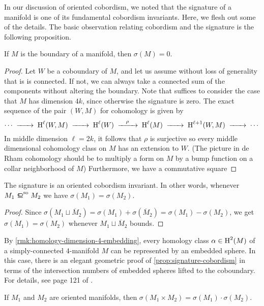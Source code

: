 \begin{remark}
In our discussion of oriented cobordism, we noted that the signature of a manifold is one of its fundamental cobordism invariants. Here, we flesh out some of the details. The basic observation relating cobordism and the signature is the following proposition.

\begin{proposition}\label{prop:signature-cobordism}
	If $M$ is the boundary of a manifold, then $\sigma(M)=0$.
\end{proposition}
\begin{proof}
	Let $W$ be a coboundary of $M$, and let us assume without loss of generality that is is connected. If not, we can always take a connected sum of the components without altering the boundary. Note that suffices to consider the case that $M$ has dimension $4k$, since otherwise the signature is zero. The exact sequence of the pair $(W,M)$ for cohomology is given by
	\[
		\cdots \lkxto \H^\ell(W,M)\lkxto \H^\ell(W)\lkxto[\rho] \H^{\ell}(M)\lkxto \H^{\ell+1}(W,M)\lkxto\cdots
	\]
	In middle dimension $\ell=2k$, it follows that $\rho$ is surjective so every middle dimensional cohomology class on $M$ has an extension to $W$. (The picture in de Rham cohomology should be to multiply a form on $M$ by a bump function on a collar neighborhood of $M$) Furthermore, we have a commutative square
\end{proof}

\begin{corollary}
	The signature is an oriented cobordism invariant. In other words, whenever $M_1\sobord M_2$ we have $\sigma(M_1)=\sigma(M_2)$.
\end{corollary}
\begin{proof}
Since $\sigma(M_1\sqcup\overline{M}_2)=\sigma(M_1)+\sigma(\overline{M}_2)=\sigma(M_1)-\sigma(M_2)$, we get $\sigma(M_1)=\sigma(M_2)$ whenever $M_1\sqcup \overline{M}_2$ bounds.
\end{proof}

\begin{remark}
	By \cref{rmk:homology-dimension-4-embedding}, every homology class $\alpha\in \operatorname{H}^2(M)$ of a simply-connected $4$-manifold $M$ can be represented by an embedded sphere. In this case, there is an elegant geometric proof of \cref{prop:signature-cobordism} in terms of the intersection numbers of embedded spheres lifted to the coboundary. For details, see page 121 of \cite{scorpan2005wild}.
\end{remark}

\begin{proposition}
	If $M_1$ and $M_2$ are oriented manifolds, then $\sigma(M_1\times M_2)=\sigma(M_1)\cdot \sigma(M_2)$.
\end{proposition}


\end{remark}
